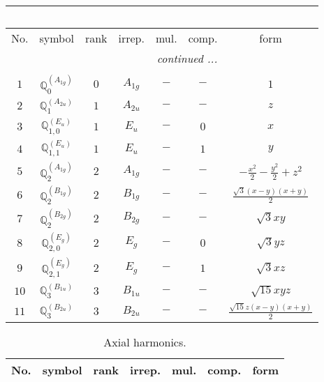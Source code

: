 \documentclass[fleqn,10pt,landscape]{article}
\begin{document}
\begin{itemize}
\begin{center}
\begin{longtable}{ccccccc}
\multicolumn{6}{l}{\tablename\ \thetable{}} \\
 \hline \hline
No. & symbol & rank & irrep. & mul. & comp. & form \\ \hline \endhead

 \hline \hline
\multicolumn{6}{r}{\footnotesize\it continued ...} \\ \endfoot

 \hline \hline
\multicolumn{6}{r}{} \\ \endlastfoot

$ 1 $ & $ \mathbb{Q}_{0}^{(A_{1g})} $ & $ 0 $ & $ A_{1g} $ & $ - $ & $ - $ & $ 1 $ \\ \hline
$ 2 $ & $ \mathbb{Q}_{1}^{(A_{2u})} $ & $ 1 $ & $ A_{2u} $ & $ - $ & $ - $ & $ z $ \\
$ 3 $ & $ \mathbb{Q}_{1,0}^{(E_{u})} $ & $ 1 $ & $ E_{u} $ & $ - $ & $ 0 $ & $ x $ \\
$ 4 $ & $ \mathbb{Q}_{1,1}^{(E_{u})} $ & $ 1 $ & $ E_{u} $ & $ - $ & $ 1 $ & $ y $ \\ \hline
$ 5 $ & $ \mathbb{Q}_{2}^{(A_{1g})} $ & $ 2 $ & $ A_{1g} $ & $ - $ & $ - $ & $ - \frac{x^{2}}{2} - \frac{y^{2}}{2} + z^{2} $ \\
$ 6 $ & $ \mathbb{Q}_{2}^{(B_{1g})} $ & $ 2 $ & $ B_{1g} $ & $ - $ & $ - $ & $ \frac{\sqrt{3} \left(x - y\right) \left(x + y\right)}{2} $ \\
$ 7 $ & $ \mathbb{Q}_{2}^{(B_{2g})} $ & $ 2 $ & $ B_{2g} $ & $ - $ & $ - $ & $ \sqrt{3} x y $ \\
$ 8 $ & $ \mathbb{Q}_{2,0}^{(E_{g})} $ & $ 2 $ & $ E_{g} $ & $ - $ & $ 0 $ & $ \sqrt{3} y z $ \\
$ 9 $ & $ \mathbb{Q}_{2,1}^{(E_{g})} $ & $ 2 $ & $ E_{g} $ & $ - $ & $ 1 $ & $ \sqrt{3} x z $ \\ \hline
$ 10 $ & $ \mathbb{Q}_{3}^{(B_{1u})} $ & $ 3 $ & $ B_{1u} $ & $ - $ & $ - $ & $ \sqrt{15} x y z $ \\
$ 11 $ & $ \mathbb{Q}_{3}^{(B_{2u})} $ & $ 3 $ & $ B_{2u} $ & $ - $ & $ - $ & $ \frac{\sqrt{15} z \left(x - y\right) \left(x + y\right)}{2} $ \\
\end{longtable}
\end{center}
\begin{center}
\renewcommand{\arraystretch}{1.3}
\begin{longtable}{ccccccc}
\caption{Axial harmonics.}
 \\
 \hline \hline
No. & symbol & rank & irrep. & mul. & comp. & form \\ \hline \endfirsthead


\end{longtable}
\end{center}
\end{itemize}
\end{document}
